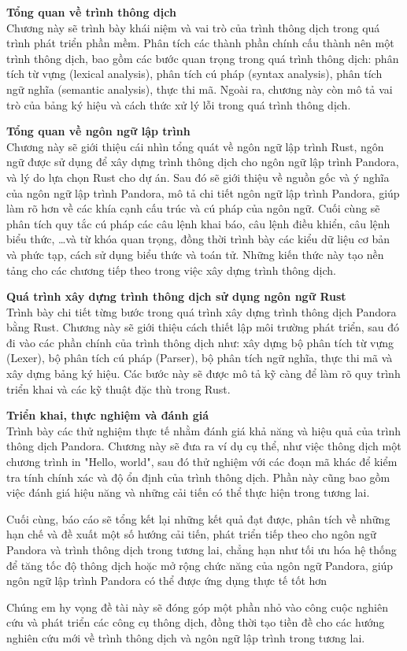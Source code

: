 \begin{mucluc}
    
    \item {\bf{Tổng quan về trình thông dịch}}\\
    Chương này sẽ trình bày khái niệm và vai trò của trình thông dịch trong quá trình phát triển phần mềm. Phân tích các thành phần chính cấu thành nên một trình thông dịch, bao gồm các bước quan trọng trong quá trình thông dịch: phân tích từ vựng (lexical analysis), phân tích cú pháp (syntax analysis), phân tích ngữ nghĩa (semantic analysis), thực thi mã. Ngoài ra, chương này còn mô tả vai trò của bảng ký hiệu và cách thức xử lý lỗi trong quá trình thông dịch.
    \item {\bf{Tổng quan về ngôn ngữ lập trình}}\\
    Chương này sẽ giới thiệu cái nhìn tổng quát về ngôn ngữ lập trình Rust, ngôn ngữ được sử dụng để xây dựng trình thông dịch cho ngôn ngữ lập trình Pandora, và lý do lựa chọn Rust cho dự án. Sau đó sẽ giới thiệu về nguồn gốc và ý nghĩa của ngôn ngữ lập trình Pandora, mô tả chi tiết ngôn ngữ lập trình Pandora, giúp làm rõ hơn về các khía cạnh cấu trúc và cú pháp của ngôn ngữ. Cuối cùng sẽ phân tích quy tắc cú pháp các câu lệnh khai báo, câu lệnh điều khiển, câu lệnh biểu thức, \dots và từ khóa quan trọng, đồng thời trình bày các kiểu dữ liệu cơ bản và phức tạp, cách sử dụng biểu thức và toán tử. Những kiến thức này tạo nền tảng cho các chương tiếp theo trong việc xây dựng trình thông dịch.  
    \item {\bf{Quá trình xây dựng trình thông dịch sử dụng ngôn ngữ Rust}}\\
    Trình bày chi tiết từng bước trong quá trình xây dựng trình thông dịch Pandora bằng Rust. Chương này sẽ giới thiệu cách thiết lập môi trường phát triển, sau đó đi vào các phần chính của trình thông dịch như: xây dựng bộ phân tích từ vựng (Lexer), bộ phân tích cú pháp (Parser), bộ phân tích ngữ nghĩa, thực thi mã và xây dựng bảng ký hiệu. Các bước này sẽ được mô tả kỹ càng để làm rõ quy trình triển khai và các kỹ thuật đặc thù trong Rust.
    \item {\bf{Triển khai, thực nghiệm và đánh giá}}\\
    Trình bày các thử nghiệm thực tế nhằm đánh giá khả năng và hiệu quả của trình thông dịch Pandora. Chương này sẽ đưa ra ví dụ cụ thể, như việc thông dịch một chương trình in "Hello, world", sau đó thử nghiệm với các đoạn mã khác để kiểm tra tính chính xác và độ ổn định của trình thông dịch. Phần này cũng bao gồm việc đánh giá hiệu năng và những cải tiến có thể thực hiện trong tương lai.
\end{mucluc}

Cuối cùng, báo cáo sẽ tổng kết lại những kết quả đạt được, phân tích về những hạn chế và đề xuất một số hướng cải tiến, phát triển tiếp theo cho ngôn ngữ Pandora và trình thông dịch  trong tương lai, chẳng hạn như tối ưu hóa hệ thống để tăng tốc độ thông dịch hoặc mở rộng chức năng của ngôn ngữ Pandora, giúp ngôn ngữ lập trình Pandora có thể được ứng dụng thực tế tốt hơn

Chúng em hy vọng đề tài này sẽ đóng góp một phần nhỏ vào công cuộc nghiên cứu và phát triển các công cụ thông dịch, đồng thời tạo tiền đề cho các hướng nghiên cứu mới về trình thông dịch và ngôn ngữ lập trình trong tương lai.